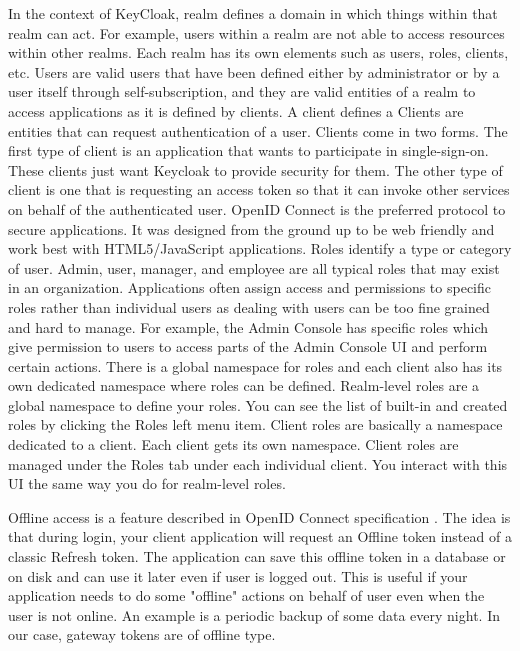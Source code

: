In the context of KeyCloak, realm defines a domain in which things within that realm can act. For example, users within a realm are not able to access resources within other realms. Each realm has its own elements such as users, roles, clients, etc. Users are valid users that have been defined either by administrator or by a user itself through self-subscription, and they are valid entities of a realm to access applications as it is defined by clients. A client defines a 
Clients are entities that can request authentication of a user. Clients come in two forms. The first type of client is an application that wants to participate in single-sign-on. These clients just want Keycloak to provide security for them. The other type of client is one that is requesting an access token so that it can invoke other services on behalf of the authenticated user. 
OpenID Connect is the preferred protocol to secure applications. It was designed from the ground up to be web friendly and work best with HTML5/JavaScript applications.
Roles identify a type or category of user. Admin, user, manager, and employee are all typical roles that may exist in an organization. Applications often assign access and permissions to specific roles rather than individual users as dealing with users can be too fine grained and hard to manage. For example, the Admin Console has specific roles which give permission to users to access parts of the Admin Console UI and perform certain actions. There is a global namespace for roles and each client also has its own dedicated namespace where roles can be defined.
Realm-level roles are a global namespace to define your roles. You can see the list of built-in and created roles by clicking the Roles left menu item.
Client roles are basically a namespace dedicated to a client. Each client gets its own namespace. Client roles are managed under the Roles tab under each individual client. You interact with this UI the same way you do for realm-level roles.

Offline access is a feature described in OpenID Connect specification . The idea is that during login, your client application will request an Offline token instead of a classic Refresh token. The application can save this offline token in a database or on disk and can use it later even if user is logged out. This is useful if your application needs to do some "offline" actions on behalf of user even when the user is not online. An example is a periodic backup of some data every night. In our case, gateway tokens are of offline type.

